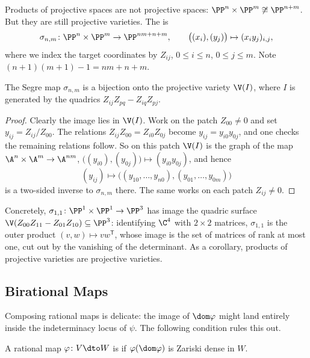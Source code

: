 \begin{example}
	Products of projective spaces are not projective spaces: $\PP^n\times\PP^m \not\cong \PP^{n+m}$. But they are still projective varieties. The  is
	$$\sigma_{n,m} \colon \PP^n \times \PP^m \to \PP^{nm+n+m}, \qquad \big((x_i),(y_j)\big) \mapsto (x_iy_j)_{i,j},$$
	where we index the target coordinates by $Z_{ij}$, $0 \leq i \leq n$, $0 \leq j \leq m$. Note $(n+1)(m+1)-1 = nm+n+m$.
\end{example}

\begin{theorem}
	The Segre map $\sigma_{n,m}$ is a bijection onto the projective variety $\V(I)$, where $I$ is generated by the quadrics $Z_{ij}Z_{pq} - Z_{iq}Z_{pj}$.
\end{theorem}

\begin{proof}
	Clearly the image lies in $\V(I)$. Work on the patch $Z_{00} \neq 0$ and set $y_{ij} = Z_{ij}/Z_{00}$. The relations $Z_{ij}Z_{00} = Z_{i0}Z_{0j}$ become $y_{ij} = y_{i0}y_{0j}$, and one checks the remaining relations follow. So on this patch $\V(I)$ is the graph of the map $\A^n \times \A^m \to \A^{nm}$, $\big((y_{i0}),(y_{0j})\big) \mapsto (y_{i0}y_{0j})$, and hence
	$$(y_{ij}) \longmapsto \big((y_{10},\dots,y_{n0}),(y_{01},\dots,y_{0m})\big)$$
	is a two-sided inverse to $\sigma_{n,m}$ there. The same works on each patch $Z_{ij} \neq 0$.
\end{proof}

Concretely, $\sigma_{1,1} \colon \PP^1\times\PP^1 \to \PP^3$ has image the quadric surface $\V(Z_{00}Z_{11} - Z_{01}Z_{10}) \subseteq \PP^3$: identifying $\C^4$ with $2\times 2$ matrices, $\sigma_{1,1}$ is the outer product $(v,w)\mapsto vw^{\mathsf T}$, whose image is the set of matrices of rank at most one, cut out by the vanishing of the determinant. As a corollary, products of projective varieties are projective varieties.

\subsection{Birational Maps}

Composing rational maps is delicate: the image of $\dom\varphi$ might land entirely inside the indeterminacy locus of $\psi$. The following condition rules this out.

\begin{definition}[Dominant]
	A rational map $\varphi \colon V \dto W$ is  if $\varphi(\dom\varphi)$ is Zariski dense in $W$.
\end{definition}

